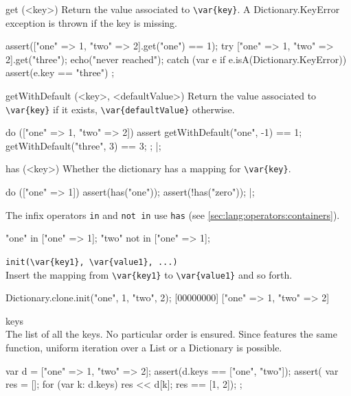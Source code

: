 \begin{urbiscriptapi}
\item[get](<key>)
  Return the value associated to \lstinline|\var{key}|.  A
  Dictionary.KeyError exception is thrown if the key is missing.

\begin{urbiscript}
assert(["one" => 1, "two" => 2].get("one") == 1);
try
{
  ["one" => 1, "two" => 2].get("three");
  echo("never reached");
}
catch (var e if e.isA(Dictionary.KeyError))
{
  assert(e.key == "three")
};
\end{urbiscript}


\item[getWithDefault](<key>, <defaultValue>)
  Return the value associated to  \lstinline|\var{key}| if it exists,
  \lstinline|\var{defaultValue}| otherwise.

\begin{urbiscript}
do (["one" => 1, "two" => 2])
{
  assert
  {
    getWithDefault("one",  -1) == 1;
    getWithDefault("three", 3) == 3;
  };
}|;
\end{urbiscript}


\item[has](<key>)
  Whether the dictionary has a mapping for \lstinline|\var{key}|.

\begin{urbiscript}
do (["one" => 1])
{
  assert(has("one"));
  assert(!has("zero"));
}|;
\end{urbiscript}

  The infix operators \lstinline|in| and \lstinline|not in| use
  \lstinline|has| (see \autoref{sec:lang:operators:containers}).

\begin{urbiassert}
"one" in     ["one" => 1];
"two" not in ["one" => 1];
\end{urbiassert}

\item \lstinline|init(\var{key1}, \var{value1}, ...)|~\\
  Insert the mapping from \lstinline|\var{key1}| to
  \lstinline|\var{value1}| and so forth.

\begin{urbiscript}
Dictionary.clone.init("one", 1, "two", 2);
[00000000] ["one" => 1, "two" => 2]
\end{urbiscript}

\item[keys]\\
  The list of all the keys.  No particular order is ensured.  Since
   features the same function, uniform iteration over
  a List or a Dictionary is possible.
\begin{urbiscript}
{
  var d = ["one" => 1, "two" => 2];
  assert(d.keys == ["one", "two"]);
  assert({
           var res = [];
           for (var k: d.keys)
             res << d[k];
           res
         }
         == [1, 2]);
};
\end{urbiscript}


\end{urbiscriptapi}
